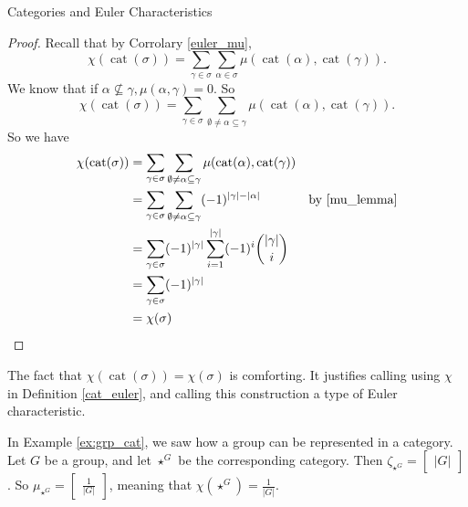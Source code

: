 \documentclass[12pt]{pom_thesis}
\DeclareMathOperator{\cat}{cat}
\begin{document}
\begin{chapter}{Categories and Euler Characteristics}
\begin{thm}
\end{thm}
\begin{proof}
Recall that by Corrolary \ref{euler_mu}, 
\[
\chi(\cat(\sigma)) = \sum_{\gamma \in \sigma} \sum_{\alpha \in \sigma} \mu(\cat(\alpha), \cat(\gamma)).
\]
We know that if $\alpha \not \subseteq \gamma, \mu(\alpha, \gamma) = 0$. So
\[
\chi(\cat(\sigma)) = \sum_{\gamma \in \sigma} \sum_{\emptyset \neq \alpha \subseteq \gamma}\mu(\cat(\alpha), \cat(\gamma)).
\]
So we have
\begin{align*}
\chi(\cat(\sigma)) &= \sum_{\gamma \in \sigma} \sum_{\emptyset \neq \alpha \subseteq \gamma}\mu(\cat(\alpha), \cat(\gamma))\\
&= \sum_{\gamma \in \sigma} \sum_{\emptyset \neq \alpha \subseteq \gamma}(-1)^{|\gamma| - |\alpha|} &\text{by \ref{mu_lemma}}\\
&= \sum_{\gamma \in \sigma}(-1)^{|\gamma|} \sum_{i = 1}^{|\gamma|} (-1)^i{|\gamma| \choose i}\\
&= \sum_{\gamma \in \sigma} (-1)^{|\gamma|} \\
&= \chi(\sigma)
\end{align*}
\end{proof}
The fact that $\chi(\cat(\sigma)) = \chi(\sigma)$ is comforting. It justifies calling using $\chi$ in Definition \ref{cat_euler}, and calling this construction a type of Euler characteristic.

\begin{examp}
In Example \ref{ex:grp_cat}, we saw how a group can be represented in a category. Let $G$ be a group, and let $\star^G$ be the corresponding category. Then $\zeta_{\star^G} = \begin{bmatrix}|G|\end{bmatrix}$. So $\mu_{\star^G} = \begin{bmatrix} \frac 1{|G|}\end{bmatrix}$, meaning that $\chi(\star^G)=\frac 1{|G|}$.
\end{examp}

\end{chapter}
\end{document}
